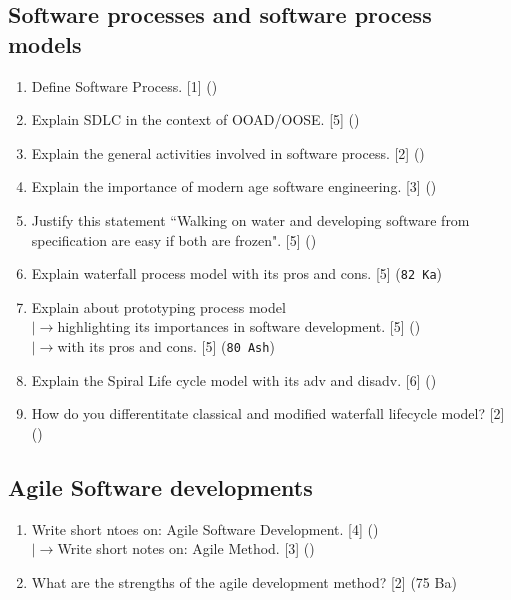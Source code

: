 \documentclass[12pt]{article}
\newcommand{\lb}{\\$\left|\rightarrow\right.$}
\begin{document}
  \subsection{Software processes and software process models}
    \begin{enumerate}
      \item Define Software Process. \hfill [1] ()

      \item Explain SDLC in the context of OOAD/OOSE. \hfill [5] ()

      \item Explain the general activities involved in software process. \hfill [2] ()

      \item Explain the importance of modern age software engineering. \hfill [3] ()

      \item Justify this statement ``Walking on water and developing software from specification are easy if both are frozen". \hfill [5] ()

      \item Explain waterfall process model with its pros and cons. \hfill [5] (\texttt{82 Ka})

      \item Explain about prototyping process model
        \lb highlighting its importances in software development. \hfill [5] ()
        \lb with its pros and cons. \hfill [5] (\texttt{80 Ash})

      \item Explain the Spiral Life cycle model with its adv and disadv. \hfill [6] ()

      \item How do you differentitate classical and modified waterfall lifecycle model? \hfill [2] ()
    \end{enumerate}

  \subsection{Agile Software developments}
    \begin{enumerate}
      

      \item Write short ntoes on: Agile Software Development. \hfill [4] ()
        \lb Write short notes on: Agile Method. \hfill [3] ()

      \item What are the strengths of the agile development method? \hfill [2] (75 Ba)
    \end{enumerate}
\end{document}
